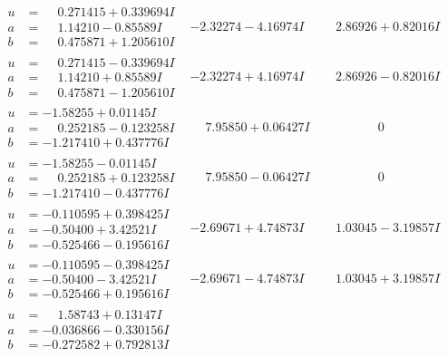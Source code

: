 \documentclass[1p]{elsarticle_modified}
\theoremstyle{definition}
\begin{document}
$$\begin{array}{c|c|c}
\begin{aligned}
u &= \phantom{-}0.271415 + 0.339694 I \\
a &= \phantom{-}1.14210 - 0.85589 I \\
b &= \phantom{-}0.475871 + 1.205610 I\end{aligned}
 & -2.32274 - 4.16974 I & \phantom{-}2.86926 + 0.82016 I \\ \hline\begin{aligned}
u &= \phantom{-}0.271415 - 0.339694 I \\
a &= \phantom{-}1.14210 + 0.85589 I \\
b &= \phantom{-}0.475871 - 1.205610 I\end{aligned}
 & -2.32274 + 4.16974 I & \phantom{-}2.86926 - 0.82016 I \\ \hline\begin{aligned}
u &= -1.58255 + 0.01145 I \\
a &= \phantom{-}0.252185 - 0.123258 I \\
b &= -1.217410 + 0.437776 I\end{aligned}
 & \phantom{-}7.95850 + 0.06427 I & \phantom{-0.000000 } 0 \\ \hline\begin{aligned}
u &= -1.58255 - 0.01145 I \\
a &= \phantom{-}0.252185 + 0.123258 I \\
b &= -1.217410 - 0.437776 I\end{aligned}
 & \phantom{-}7.95850 - 0.06427 I & \phantom{-0.000000 } 0 \\ \hline\begin{aligned}
u &= -0.110595 + 0.398425 I \\
a &= -0.50400 + 3.42521 I \\
b &= -0.525466 - 0.195616 I\end{aligned}
 & -2.69671 + 4.74873 I & \phantom{-}1.03045 - 3.19857 I \\ \hline\begin{aligned}
u &= -0.110595 - 0.398425 I \\
a &= -0.50400 - 3.42521 I \\
b &= -0.525466 + 0.195616 I\end{aligned}
 & -2.69671 - 4.74873 I & \phantom{-}1.03045 + 3.19857 I \\ \hline\begin{aligned}
u &= \phantom{-}1.58743 + 0.13147 I \\
a &= -0.036866 - 0.330156 I \\
b &= -0.272582 + 0.792813 I\end{aligned}

\end{array}$$
\end{document}
